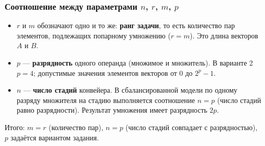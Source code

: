 \subsubsection*{Соотношение между параметрами $n$, $r$, $m$, $p$}

\begin{itemize}
    \item $r$ и $m$ обозначают одно и то же: \textbf{ранг задачи}, то есть количество пар элементов, подлежащих попарному умножению ($r = m$). Это длина векторов $A$ и $B$.
    \item $p$ --- \textbf{разрядность} одного операнда (множимое и множитель). В варианте 2 $p = 4$; допустимые значения элементов векторов от $0$ до $2^p - 1$.
    \item $n$ --- \textbf{число стадий} конвейера. В сбалансированной модели по одному разряду множителя на стадию выполняется соотношение $n = p$ (число стадий равно разрядности). Результат умножения имеет разрядность $2p$.
\end{itemize}

Итого: $m = r$ (количество пар), $n = p$ (число стадий совпадает с разрядностью), $p$ задаётся вариантом задания.
